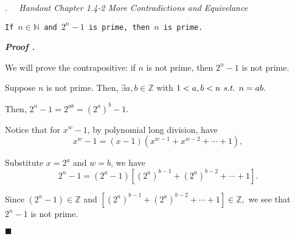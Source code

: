 \documentclass[10pt,letter]{article}
\newcounter{nq}[section]
\newcounter{np}[section]
\newenvironment*{p}{\par\noindent\textbf{\textit{Proof \stepcounter{np}\thenp. }}\par}{\par\hfill $\blacksquare$\par}
\newenvironment*{q}[1]{\noindent\emph{\thesection.\stepcounter{nq}\thenq$\quad $ #1}\par\noindent\texttt}{}
\def\Z{{\mathbb{Z}}}
\def\N{{\mathbb{N}}}
\def\st{\emph{ s.t. }}
\begin{document}
\begin{framed}\begin{q}
	{Handout Chapter 1.4-2 More Contradictions and Equivelance}
	{If $n\in\N$ and $2^n-1$ is prime, then $n$ is prime.}
\end{q}\end{framed}
\begin{p}
	We will prove the contrapositive: if $n$ is not prime, then $2^n-1$ is not prime.\par Suppose $n$ is not prime. Then, $\exists a,b\in\Z$ with $1<a,b<n\st n=ab.$\par Then, $2^n-1=2^{ab}=\left(2^a\right)^b-1.$\par Notice that for $x^w-1$, by polynomial long division, have \[x^w-1=(x-1)\left(x^{w-1}+x^{w-2}+\cdots+1\right),\]\par Substitute $x=2^a$ and $w=b$, we have \[2^n-1=\left(2^a-1\right)\left[\left(2^a\right)^{b-1}+\left(2^a\right)^{b-2}+\cdots+1\right].\]\par Since $\left(2^a-1\right)\in\Z$ and $\left[\left(2^a\right)^{b-1}+\left(2^a\right)^{b-2}+\cdots+1\right]\in\Z,$ we see that $2^n-1$ is not prime. 
\end{p}











\label{LastPage}
\end{document}
